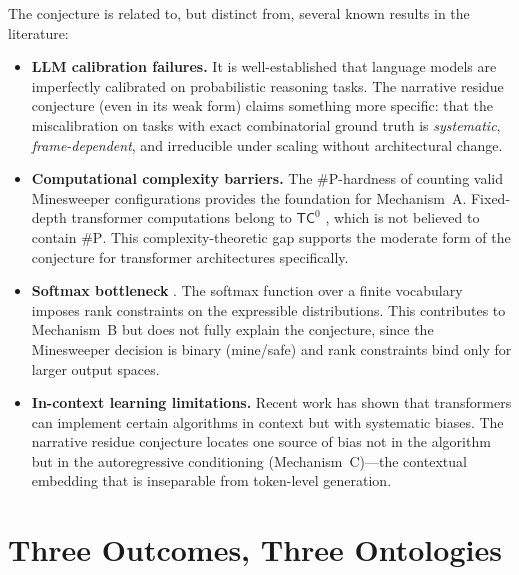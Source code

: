 \documentclass[12pt,a4paper]{article}
\theoremstyle{definition}
\theoremstyle{remark}
\begin{document}
The conjecture is related to, but distinct from, several known results
in the literature:

\begin{itemize}
  \item \textbf{LLM calibration failures.}  It is well-established
    that language models are imperfectly calibrated on probabilistic
    reasoning tasks.  The narrative residue conjecture (even in its
    weak form) claims something more specific: that the miscalibration
    on tasks with exact combinatorial ground truth is \emph{systematic},
    \emph{frame-dependent}, and irreducible under scaling without
    architectural change.

  \item \textbf{Computational complexity barriers.}  The
    \textsc{\#P}-hardness of counting valid Minesweeper configurations
    \citep{Kaye2000} provides the foundation for Mechanism~A.
    Fixed-depth transformer computations belong to $\mathsf{TC}^0$
    \citep{Merrill2023}, which is not believed to contain
    \textsc{\#P}.  This complexity-theoretic gap supports the
    moderate form of the conjecture for transformer architectures
    specifically.

  \item \textbf{Softmax bottleneck} \citep{Yang2018Breaking}.
    The softmax function over a finite vocabulary imposes rank
    constraints on the expressible distributions.  This contributes
    to Mechanism~B but does not fully explain the conjecture,
    since the Minesweeper decision is binary (mine/safe) and rank
    constraints bind only for larger output spaces.

  \item \textbf{In-context learning limitations.}  Recent work has
    shown that transformers can implement certain algorithms in
    context but with systematic biases.  The narrative residue
    conjecture locates one source of bias not in the algorithm but in
    the autoregressive conditioning (Mechanism~C)---the contextual
    embedding that is inseparable from token-level generation.
\end{itemize}


\section{Three Outcomes, Three Ontologies}
\label{sec:three-outcomes}
\end{document}
